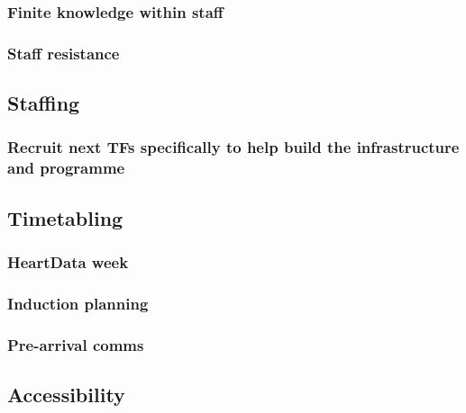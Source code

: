 \documentclass[
  11pt,
  letterpaper,
  oneside,
  open=any]{scrbook}
\begin{document}
\hypertarget{finite-knowledge-within-staff}{%
\subsubsection{Finite knowledge within
staff}\label{finite-knowledge-within-staff}}

\hypertarget{staff-resistance}{%
\subsubsection{Staff resistance}\label{staff-resistance}}

\hypertarget{staffing}{%
\subsection{Staffing}\label{staffing}}

\hypertarget{recruit-next-tfs-specifically-to-help-build-the-infrastructure-and-programme}{%
\subsubsection{Recruit next TFs specifically to help build the
infrastructure and
programme}\label{recruit-next-tfs-specifically-to-help-build-the-infrastructure-and-programme}}

\hypertarget{timetabling}{%
\subsection{Timetabling}\label{timetabling}}

\hypertarget{heartdata-week}{%
\subsubsection{HeartData week}\label{heartdata-week}}

\hypertarget{induction-planning}{%
\subsubsection{Induction planning}\label{induction-planning}}

\hypertarget{pre-arrival-comms}{%
\subsubsection{Pre-arrival comms}\label{pre-arrival-comms}}

\hypertarget{accessibility}{%
\subsection{Accessibility}\label{accessibility}}
\end{document}
